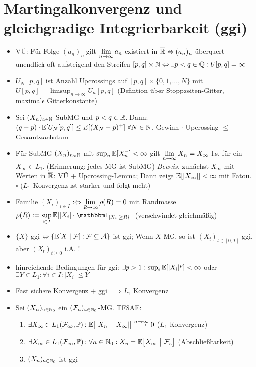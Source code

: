 \documentclass[12pt]{scrartcl}
\begin{document}
	\section{Martingalkonvergenz und gleichgradige Integrierbarkeit (ggi)}
	\begin{itemize}
		\item VÜ: Für Folge $(a_n)_n$ gilt $\lim\limits_{n\to\infty} a_n$ existiert  in $\overline{\mathbb{R}}\Leftrightarrow(a_n)_n$ überquert unendlich oft aufsteigend den Streifen $[p,q]\times\mathbb{N}\Leftrightarrow\exists p<q\in\mathbb{Q}:U[p,q]=\infty$
		\item $U_N[p,q]$ ist Anzahl Upcrossings auf $[p,q]\times\lbrace0,1,\ldots,N\rbrace$ mit $U[p,q]=\limsup_{n\to\infty} U_n[p,q]$ (Defintion über Stoppzeiten-Gitter, maximale Gitterkonstante)
		\item {} Sei $(X_n)_{n\in\mathbb{N}}$ SubMG und $p<q\in\mathbb{R}$. Dann:
		$(q-p)\cdot\mathbb{E}[U_N[p,q]]\leq\\E[(X_N-p)^+]~\forall N\in\mathbb{N}$. Gewinn $\cdot$ Upcrossing $\leq$ Gesamtwachstum
		\item {} Für SubMG $(X_n)_{n\in\mathbb{N}}$ mit $\sup_n\mathbb{E}[X_n^+]<\infty$ gilt $\lim\limits_{n\to\infty} X_n=X_\infty$ f.s. für ein $X_\infty\in L_1$. (Erinnerung: jedes MG ist SubMG)
		\textit{Beweis.} zunächst $X_\infty$ mit Werten in $\overline{\mathbb{R}}$: VÜ + Upcrossing-Lemma; Dann zeige $\mathbb{E}[|X_\infty|]<\infty$ mit Fatou. $\square$ ($L_1$-Konvergenz ist stärker und folgt nicht)
		\item Familie $(X_i)_{i\in I}$  $:\Leftrightarrow\lim\limits_{R\to\infty}\rho(R)=0$ mit Randmasse $\rho(R):=\sup\limits_{i\in I}\E[|X_i|\cdot\indi_{|X_i|\geq R\rbrace}]$ (verschwindet gleichmäßig)
		\item $\lbrace X\rbrace$ ggi $\Leftrightarrow\lbrace\mathbb{E}[X\mid\mathcal{F}]:\mathcal{F}\subseteq\mathcal{A}\rbrace$ ist ggi; Wenn $X$ MG, so ist $(X_t)_{t\in[0,T]}$ ggi, aber $(X_t)_{t\geq0}$ i.A. !
		\item hinreichende Bedingungen für ggi: $\exists p>1:\sup_{i}\mathbb{E}[|X_i|^p]<\infty$ oder $\exists Y\in L_1:\forall i\in I:|X_i|\leq Y$
		\item Fast sichere Konvergenz + ggi $\implies L_1$ Konvergenz
		\item {} Sei $(X_n)_{n\in\mathbb{N}_0}$ ein $(\mathcal{F}_n)_{n\in\mathbb{N}_0}$-MG. 
		TFSAE:
		\begin{enumerate}[label=(\alph*)]
			\item $\begin{aligned}
				\exists X_\infty\in L_1(\mathcal{F}_\infty,\mathbb{P}):\mathbb{E}\big[|X_n-X_\infty|\big]\stackrel{n\to\infty}{\longrightarrow}0
			\end{aligned}$ ($L_1$-Konvergenz)
			\item $\begin{aligned}
				\exists X_\infty\in L_1(\mathcal{F}_\infty,\mathbb{P}):\forall n\in\mathbb{N}_0: X_n=\mathbb{E}\big[X_\infty~\big|~\mathcal{F}_n\big]
			\end{aligned}$ (Abschließbarkeit)
			\item $\begin{aligned}
				(X_n)_{n\in\mathbb{N}_0}
			\end{aligned}$ ist ggi
		\end{enumerate}
	\end{itemize}
	
\end{document}
